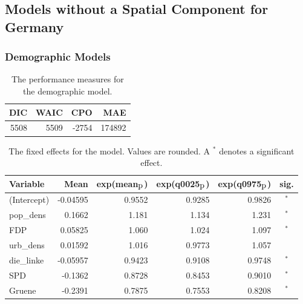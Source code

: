 \subsection{Models without a Spatial Component for Germany}
\subsubsection{Demographic Models}
\begin{table}[H] 
\caption{The performance measures for the demographic model. \label{demoGermany_nospatial}}
\begin{tabular}{r r r r}
\toprule\textbf{DIC}	& \textbf{WAIC} & \textbf{CPO} & \textbf{MAE}\\
\midrule
5508 & 5509 & -2754 & 174892 \\
\bottomrule
\end{tabular}
\end{table} 
\begin{table}[H]
\caption{The fixed effects for the model. Values are rounded. A $^*$ denotes a significant effect. \label{fixedDemoGermany_nospatial}}
\begin{tabular}{l r r r r c}
\toprule
\textbf{Variable}	& \textbf{Mean}	& \textbf{exp(mean$_{\hbox{p}}$)} & \textbf{exp(q0025$_{\hbox{p}}$)} & \textbf{exp(q0975$_{\hbox{p}}$)} & \textbf{sig.}\\
\midrule
(Intercept) & -0.04595 & 0.9552 & 0.9285 & 0.9826 & $^*$\\
pop\_dens & 0.1662 & 1.181& 1.134 & 1.231 &$^*$\\
FDP & 0.05825 & 1.060& 1.024 & 1.097 &$^*$\\
urb\_dens & 0.01592 & 1.016 & 0.9773& 1.057 &\\
die\_linke & -0.05957 & 0.9423 & 0.9108 & 0.9748 & $^*$\\
SPD & -0.1362 & 0.8728 & 0.8453 & 0.9010 & $^*$\\
Gruene & -0.2391 & 0.7875 & 0.7553 & 0.8208 & $^*$\\
\bottomrule
\end{tabular}
\end{table}
